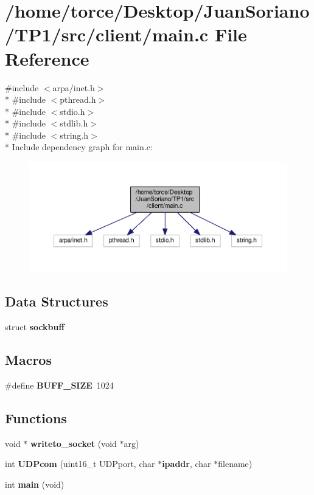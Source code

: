 \section{/home/torce/\+Desktop/\+Juan\+Soriano/\+T\+P1/src/client/main.c File Reference}
\label{client_2main_8c}
{\ttfamily \#include $<$arpa/inet.\+h$>$}\\*
{\ttfamily \#include $<$pthread.\+h$>$}\\*
{\ttfamily \#include $<$stdio.\+h$>$}\\*
{\ttfamily \#include $<$stdlib.\+h$>$}\\*
{\ttfamily \#include $<$string.\+h$>$}\\*
Include dependency graph for main.\+c\+:
\nopagebreak
\begin{figure}[H]
\begin{center}
\leavevmode
\includegraphics[width=350pt]{client_2main_8c__incl}
\end{center}
\end{figure}
\subsection*{Data Structures}
\begin{DoxyCompactItemize}
\item 
struct {\bf sockbuff}
\end{DoxyCompactItemize}
\subsection*{Macros}
\begin{DoxyCompactItemize}
\item 
\#define {\bf B\+U\+F\+F\+\_\+\+S\+I\+ZE}~1024
\end{DoxyCompactItemize}
\subsection*{Functions}
\begin{DoxyCompactItemize}
\item 
void $\ast$ {\bf writeto\+\_\+socket} (void $\ast$arg)
\item 
int {\bf U\+D\+Pcom} (uint16\+\_\+t U\+D\+Pport, char $\ast${\bf ipaddr}, char $\ast$filename)
\item 
int {\bf main} (void)
\end{DoxyCompactItemize}

